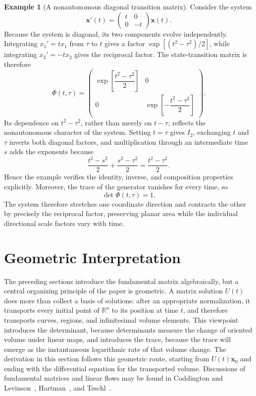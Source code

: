 \documentclass[11pt,a4paper]{article}
\newcommand{\be}{\begin{equation}}
\newcommand{\ee}{\end{equation}}
\newcommand{\lb}[1]{\label{#1}}
\newcommand{\R}{\mathbb{R}}
\theoremstyle{definition}
\newtheorem{example}{Example}[section]
\numberwithin{equation}{section}
\begin{document}
\begin{example}[A nonautonomous diagonal transition matrix]
Consider the system
\be
\mathbf{x}'(t)
=\begin{pmatrix}
t&0\\
0&-t
\end{pmatrix}\mathbf{x}(t).
\lb{eq:transition-example-system}
\ee
Because the system is diagonal, its two components evolve independently. Integrating $x_1'=tx_1$ from $\tau$ to $t$ gives a factor $\exp[(t^2-\tau^2)/2]$, while integrating $x_2'=-tx_2$ gives the reciprocal factor. The state-transition matrix is therefore
\be
\Phi(t,\tau)
=\begin{pmatrix}
\exp\!\left[\dfrac{t^2-\tau^2}{2}\right]&0\\
0&\exp\!\left[-\dfrac{t^2-\tau^2}{2}\right]
\end{pmatrix}.
\lb{eq:transition-example-phi}
\ee
Its dependence on $t^2-\tau^2$, rather than merely on $t-\tau$, reflects the nonautonomous character of the system. Setting $t=\tau$ gives $I_2$, exchanging $t$ and $\tau$ inverts both diagonal factors, and multiplication through an intermediate time $s$ adds the exponents because
\be
\frac{t^2-s^2}{2}+\frac{s^2-\tau^2}{2}
=\frac{t^2-\tau^2}{2}.
\lb{eq:transition-example-composition-exponent}
\ee
Hence the example verifies the identity, inverse, and composition properties explicitly. Moreover, the trace of the generator vanishes for every time, so
\be
\det\Phi(t,\tau)=1.
\lb{eq:transition-example-determinant}
\ee
The system therefore stretches one coordinate direction and contracts the other by precisely the reciprocal factor, preserving planar area while the individual directional scale factors vary with time.
\end{example}

\section{Geometric Interpretation}

The preceding sections introduce the fundamental matrix algebraically, but a central organizing principle of the paper is geometric. A matrix solution $U(t)$ does more than collect a basis of solutions: after an appropriate normalization, it transports every initial point of $\R^n$ to its position at time $t$, and therefore transports curves, regions, and infinitesimal volume elements. This viewpoint introduces the determinant, because determinants measure the change of oriented volume under linear maps, and introduces the trace, because the trace will emerge as the instantaneous logarithmic rate of that volume change. The derivation in this section follows this geometric route, starting from $U(t)\mathbf{x}_0$ and ending with the differential equation for the transported volume. Discussions of fundamental matrices and linear flows may be found in Coddington and Levinson~\cite{coddington1955}, Hartman~\cite{hartman2002}, and Teschl~\cite{teschl2012}.
\end{document}
